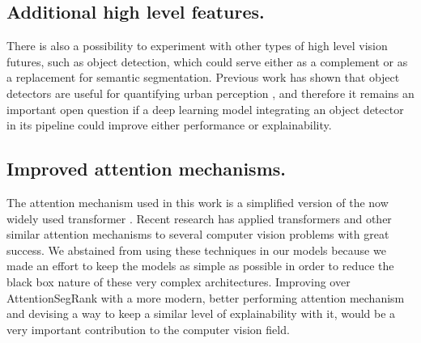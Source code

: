 \subsection{Additional high level features.}
There is also a possibility to experiment with other types of high level vision futures, such as object
detection, which could serve either as a complement or as a replacement for semantic segmentation.
Previous work has shown that object detectors are useful for quantifying urban perception \cite{rossetti},
and therefore it remains an important open question if a deep learning model integrating an object detector
in its pipeline could improve either performance or explainability.

\subsection{Improved attention mechanisms.}
The attention mechanism used in this work is a simplified version of the now widely
used transformer \cite{vaswani_attention}. Recent research has applied transformers and other similar
attention mechanisms to several computer vision problems with great success. We abstained from using
these techniques in our models because we made an effort to keep the models as simple as possible in order
to reduce the black box nature of these very complex architectures. Improving over AttentionSegRank with
a more modern, better performing attention mechanism and devising a way to keep a similar level of explainability
with it, would be a very important contribution to the computer vision field.